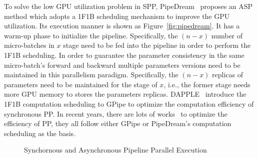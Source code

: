 To solve the low GPU utilization problem in SPP,
PipeDream~\cite{narayananPipeDreamGeneralizedPipeline2019} proposes an ASP method
which adopts a 1F1B scheduling mechanism to improve the GPU utilization.
Its execution manner is shown as Figure~\ref{fig:pipedream}.
It has a warm-up phase to initialize the pipeline.
Specifically, the $(n-x)$ number of micro-batches in $x$ stage need to be fed into the pipeline
in order to perform the 1F1B scheduling.
In order to guarantee the parameter consistency in the same micro-batch's forward and backward
multiple parameters versions need to be maintained in this parallelism paradigm.
Specifically, the $(n-x)$ replicas of parameters need to be maintained for the stage of $x$,
i.e., the former stage needs more GPU memory to stores the parameters replicas.
DAPPLE~\cite{fanDAPPLEPipelinedData2021} introduce the 1F1B computation scheduling to GPipe
to optimize the computation efficiency of synchronous PP.
In recent years, there are lots of works~\cite{sunAdaPipeOptimizingPipeline2024,vzhaoVPipeVirtualizedAcceleration2022,liChimeraEfficientlyTraining2021,kimBPipeMemoryBalancedPipeline2023}
to optimize the efficiency of PP,
they all follow either GPipe or PipeDream's computation scheduling as the basis.
\begin{figure}[htb]
  \centering
  \caption{Synchornous and Asynchronous Pipeline Parallel Execution}
  \label{fig:pp-exec}
\end{figure}

